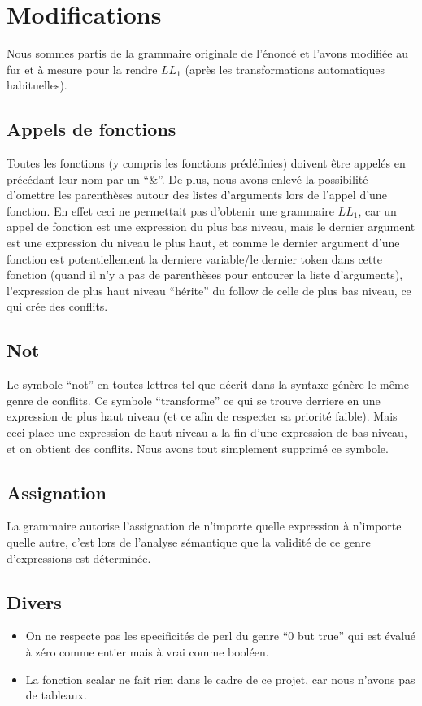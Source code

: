 \documentclass[a4paper,10pt]{article}
\begin{document}
\section{Modifications}

	Nous sommes partis de la grammaire originale de l'énoncé et l'avons
	modifiée au fur et à mesure pour la rendre $LL_1$ (après les transformations
	automatiques habituelles).

	\subsection{Appels de fonctions}
		Toutes les fonctions (y compris les fonctions prédéfinies) doivent être
		appelés en précédant leur nom par un ``$\&$''. De plus, nous avons enlevé la
		possibilité d'omettre les parenthèses autour des listes	d'arguments lors de
		l'appel d'une fonction. En effet ceci ne permettait pas d'obtenir une
		grammaire $LL_1$, car un appel de fonction est une expression du plus bas
		niveau, mais le dernier argument est une expression du niveau le plus haut, et
		comme le dernier argument d'une fonction est potentiellement la derniere
		variable/le dernier token dans cette fonction (quand il n'y a pas de
		parenthèses pour entourer la liste d'arguments), l'expression de plus haut
		niveau ``hérite'' du follow de celle de plus bas niveau, ce qui crée des
		conflits.
	
	\subsection{Not}
		Le symbole ``not'' en toutes lettres tel que décrit dans la syntaxe génère le
		même genre de conflits. Ce symbole ``transforme'' ce qui se trouve derriere en
		une expression de plus haut niveau (et ce afin de respecter sa priorité
		faible). Mais ceci place une expression de haut niveau a la fin d'une
		expression de bas niveau, et on obtient des conflits. Nous avons tout
		simplement supprimé ce symbole.
		
	\subsection{Assignation} 
		La grammaire autorise l'assignation de n'importe quelle
		expression à n'importe quelle autre, c'est lors de l'analyse sémantique
		que la validité de ce genre d'expressions est déterminée.
		
	\subsection{Divers}
		\begin{itemize}
		\item On ne respecte pas les specificités de perl du genre ``0 but true'' qui est
		évalué à zéro comme entier mais à vrai comme booléen.
		\item La fonction scalar ne fait rien dans le cadre de ce projet, car nous
		n'avons pas de tableaux.
		\end{itemize}
\end{document}
